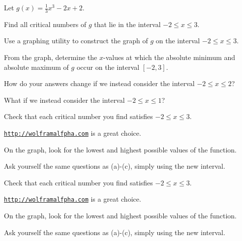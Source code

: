 \begin{activity} \label{A:3.3.1}  Let $g(x) = \frac{1}{3}x^3 - 2x + 2.$
	\ba
	\item Find all critical numbers of $g$ that lie in the interval $-2 \le x \le 3$.
	\item Use a graphing utility to construct the graph of $g$ on the interval $-2 \le x \le 3$.
	\item From the graph, determine the $x$-values at which the absolute minimum and absolute maximum of $g$ occur on the interval $[-2,3]$.
	\item How do your answers change if we instead consider the interval $-2 \le x \le 2$?
	\item What if we instead consider the interval $-2 \le x \le 1$?
	\ea
\end{activity}
\begin{smallhint}
	\ba
	\item Check that each critical number you find satisfies $-2 \le x \le 3$.
	\item \href{http://wolframalpha.com}{\texttt{http://wolframalfpha.com}} is a great choice.
	\item On the graph, look for the lowest and highest possible values of the function.
	\item Ask yourself the same questions as (a)-(c), simply using the new interval.
	\ea
\end{smallhint}
\begin{bighint}
	\ba
	\item Check that each critical number you find satisfies $-2 \le x \le 3$.
	\item \href{http://wolframalpha.com}{\texttt{http://wolframalfpha.com}} is a great choice.
	\item On the graph, look for the lowest and highest possible values of the function.
	\item Ask yourself the same questions as (a)-(c), simply using the new interval.
	\ea
\end{bighint}
